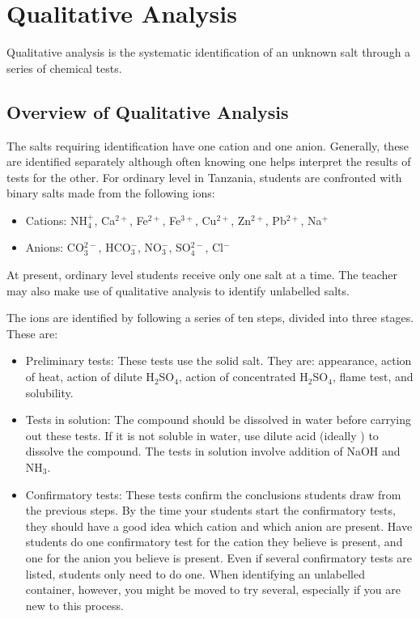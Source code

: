 \chapter{Qualitative Analysis}
\label{cha:qualana}

Qualitative analysis is the systematic identification of an unknown salt through a series of chemical tests.

\section{Overview of Qualitative Analysis}

The salts requiring identification have one cation and one anion. Generally, these are identified separately although often knowing one helps interpret the results of tests for the other. For ordinary level in Tanzania, students are confronted with binary salts made from the following ions:

\begin{itemize}
\item{Cations: NH$_{4}^{+}$, 
Ca$^{2+}$, 
Fe$^{2+}$, 
Fe$^{3+}$, 
Cu$^{2+}$, 
Zn$^{2+}$, 
Pb$^{2+}$, 
Na$^{+}$}
\item{Anions: CO$_{3}^{2-}$, 
HCO$_{3}^{-}$, 
NO$_{3}^{-}$, 
SO$_{4}^{2-}$, 
Cl$^{-}$}
\end{itemize}
At present, 
ordinary level students receive only one salt at a time. The teacher may also make use of qualitative analysis to identify unlabelled salts.

The ions are identified by following a series of ten steps, divided into three stages. These are:
\begin{itemize}
\item{Preliminary tests:
These tests use the solid salt. They are: appearance, action of heat, action of dilute H$_{2}$SO$_{4}$, action of concentrated H$_{2}$SO$_{4}$, flame test, and solubility.}
\item{Tests in solution: The compound should be dissolved in water before carrying out these tests. If it is not soluble in water, use dilute acid (ideally ) to dissolve the compound. The tests in solution involve addition of NaOH and NH$_{3}$.}
\item{Confirmatory tests: These tests confirm the conclusions students draw from the previous steps. By the time your students start the confirmatory tests, they should have a good idea which cation and which anion are present. Have students do one confirmatory test for the cation they believe is present, and one for the anion you believe is present. Even if several confirmatory tests are listed, students only need to do one. When identifying an unlabelled container, however, you might be moved to try several, especially if you are new to this process.}
\end{itemize}

